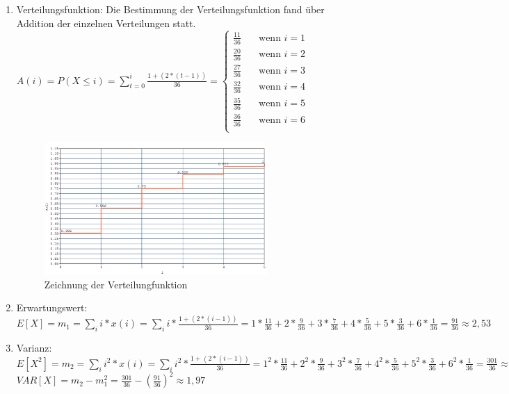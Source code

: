 \documentclass[%
10pt,              %
ngerman,           %
a4paper,           %
DIV11,             %
]{scrartcl}%
\begin{document}
\begin{enumerate}
	\item Verteilungsfunktion: Die Bestimmung der Verteilungsfunktion fand über Addition der einzelnen Verteilungen statt.\newline
	$A(i) = P(X \leq i) = \sum_{t=0}^i\frac{1 + (2 * (t - 1))}{36} = 
    \begin{cases}
        \frac{11}{36}& \quad \text{wenn } i = 1\\
        \frac{20}{36} & \quad \text{wenn } i = 2\\
        \frac{27}{36} & \quad \text{wenn } i = 3\\
        \frac{32}{36} & \quad \text{wenn } i = 4\\
        \frac{35}{36} & \quad \text{wenn } i = 5\\
        \frac{36}{36} & \quad \text{wenn } i = 6\\
    \end{cases}
    $ \\
    \begin{figure}[!htbp]
      \centering
        \caption{Zeichnung der Verteilungfunktion}
        \includegraphics[width=0.8\textwidth]{xminvertfkt}
    \end{figure}
	
	\item Erwartungswert: $E[X] = m_1 = \sum_{i}i * x(i) = \sum_{i}i * \frac{1 + (2 * (i - 1))}{36} = 1 * \frac{11}{36} + 2 * \frac{9}{36} + 3 * \frac{7}{36} + 4 * \frac{5}{36} + 5 * \frac{3}{36} + 6 * \frac{1}{36} = \frac{91}{36} \approx 2,53$\newline
    \item Varianz: $E[X^2] = m_2 = \sum_{i}i^2 * x(i) = \sum_{i}i^2 * \frac{1 + (2 * (i - 1))}{36} = 1^2 * \frac{11}{36} + 2^2 * \frac{9}{36} + 3^2 * \frac{7}{36} + 4^2 * \frac{5}{36} + 5^2 * \frac{3}{36} + 6^2 * \frac{1}{36} = \frac{301}{36} \approx 8.36$
    \\
    $VAR[X] = m_2 - m_1^2 = \frac{301}{36} - (\frac{91}{36})^2 \approx 1,97$ 
\end{enumerate}
\end{document}
